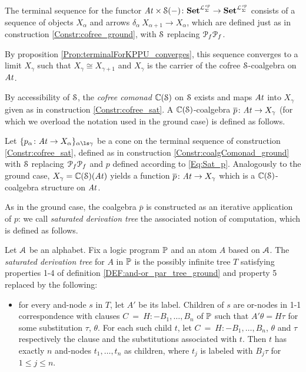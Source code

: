 \begin{construction}\label{Constr:cofree_sat} The terminal sequence for the functor $\mathit{At} \times \mathcal{S} (-) \colon \mathbf{Set}^{\mathcal{L}^{\mathit{op}}_{\Sigma}} \to \mathbf{Set}^{\mathcal{L}^{\mathit{op}}_{\Sigma}}$ consists of a sequence of objects $X_{\alpha}$ and arrows $\delta_{\alpha}\: X_{\alpha+1} \to X_{\alpha}$, which are defined just as in construction \ref{Constr:cofree_ground}, with $\mathcal{S}$ replacing $\mathcal P_f \mathcal P_f$.

By proposition \ref{Prop:terminalForKPPU_converges}, this sequence converges to a limit $X_{\gamma}$ such that $X_{\gamma} \cong X_{\gamma+1}$ and $X_{\gamma}$ is the carrier of the cofree $\mathcal{S}$-coalgebra on $\mathit{At}$.
\end{construction}
By accessibility of $\mathcal{S}$, the \emph{cofree comonad} $\mathbb{C}(\mathcal{S})$ on $\mathcal{S}$ exists and maps $\mathit{At}$ into $X_{\gamma}$ given as in construction \ref{Constr:cofree_sat}. A $\mathbb{C}(\mathcal{S})$-coalgebra $\overline{p} \colon \mathit{At} \to X_{\gamma}$ (for which we overload the notation used in the ground case) is defined as follows.
\begin{construction}\label{Constr:coalgComonad_sat} Let $\{p_{\alpha}\: \At \to X_{\alpha}\}_{\alpha \ls \gamma}$ be a cone on the terminal sequence of construction \ref{Constr:cofree_sat}, defined as in construction \ref{Constr:coalgComonad_ground} with $\mathcal{S}$ replacing $\mathcal P_f \mathcal P_f$ and $p$ defined according to \eqref{Eq:Sat_p}. Analogously to the ground case, $X_{\gamma} = \mathbb{C}(\mathcal{S})(\mathit{At})$ yields a function $\overline{p}\colon \mathit{At} \to X_{\gamma}$ which is a $\mathbb{C}(\mathcal{S})$-coalgebra structure on $\mathit{At}$.
\end{construction}
As in the ground case, the coalgebra $\overline{p}$ is constructed as an iterative application of $p$: we call \emph{saturated derivation tree} the associated notion of computation, which is defined as follows.

\begin{definition} Let $\mathcal{A}$ be an alphabet. Fix a logic program $\mathbb{P}$ and an atom $A$ based on $\mathcal{A}$. The \emph{saturated derivation tree} for $A$ in $\mathbb{P}$ is the possibly infinite tree $T$ satisfying properties 1-4 of definition \ref{DEF:and-or_par_tree_ground} and property 5 replaced by the following:
 \begin{itemize}
  \item for every and-node $s$ in $T$, let $A'$ be its label.  Children of $s$ are or-nodes in 1-1 correspondence with clauses $C\ =\ H:- B_1,\dots,B_n$ of $\mathbb{P}$ such that $A'\theta = H\tau$ for some substitution $\tau$, $\theta$. For each such child $t$, let $C\ =\ H:- B_1,\dots,B_n$, $\theta$ and $\tau$ respectively the clause and the substitutions associated with $t$. Then $t$ has exactly $n$ and-nodes $t_1,\dots,t_n$ as children, where $t_j$ is labeled with $B_j \tau$ for $1 \leq j \leq n$.
 \end{itemize}
\end{definition}

